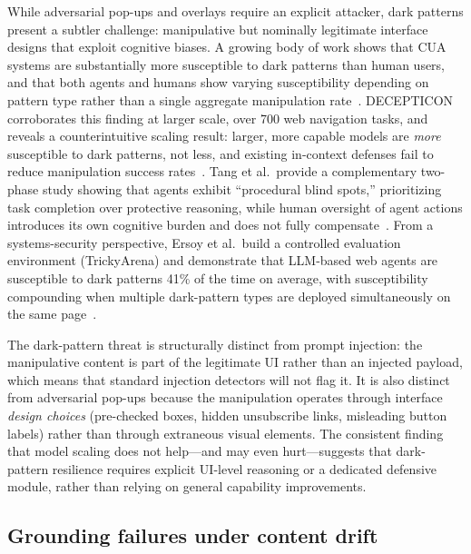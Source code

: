 While adversarial pop-ups and overlays require an explicit attacker, dark patterns present a subtler challenge: manipulative but nominally legitimate interface designs that exploit cognitive biases. A growing body of work shows that CUA systems are substantially more susceptible to dark patterns than human users, and that both agents and humans show varying susceptibility depending on pattern type rather than a single aggregate manipulation rate~\cite{susbench2025}. DECEPTICON corroborates this finding at larger scale, over 700 web navigation tasks, and reveals a counterintuitive scaling result: larger, more capable models are \emph{more} susceptible to dark patterns, not less, and existing in-context defenses fail to reduce manipulation success rates~\cite{decepticon2025}. Tang et al.\ provide a complementary two-phase study showing that agents exhibit ``procedural blind spots,'' prioritizing task completion over protective reasoning, while human oversight of agent actions introduces its own cognitive burden and does not fully compensate~\cite{darkpatternsgui2025}. From a systems-security perspective, Ersoy et al.\ build a controlled evaluation environment (TrickyArena) and demonstrate that LLM-based web agents are susceptible to dark patterns 41\% of the time on average, with susceptibility compounding when multiple dark-pattern types are deployed simultaneously on the same page~\cite{darkpatternssp2026}.

The dark-pattern threat is structurally distinct from prompt injection: the manipulative content is part of the legitimate UI rather than an injected payload, which means that standard injection detectors will not flag it. It is also distinct from adversarial pop-ups because the manipulation operates through interface \emph{design choices} (pre-checked boxes, hidden unsubscribe links, misleading button labels) rather than through extraneous visual elements. The consistent finding that model scaling does not help---and may even hurt---suggests that dark-pattern resilience requires explicit UI-level reasoning or a dedicated defensive module, rather than relying on general capability improvements.

\subsection{Grounding failures under content drift}

